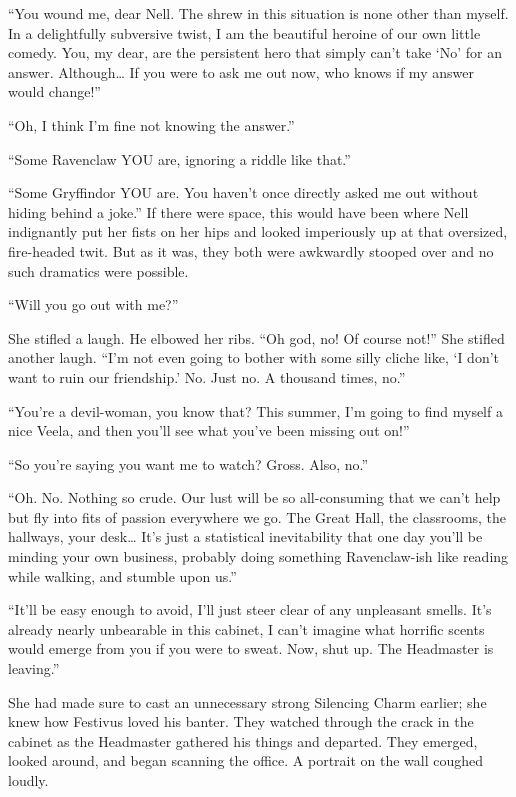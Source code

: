 “You wound me, dear Nell. The shrew in this situation is none other than myself. In a delightfully subversive twist, I am the beautiful heroine of our own little comedy. You, my dear, are the persistent hero that simply can’t take ‘No’ for an answer. Although… If you were to ask me out now, who knows if my answer would change!”

“Oh, I think I’m fine not knowing the answer.”

“Some Ravenclaw YOU are, ignoring a riddle like that.”

“Some Gryffindor YOU are. You haven’t once directly asked me out without hiding behind a joke.” If there were space, this would have been where Nell indignantly put her fists on her hips and looked imperiously up at that oversized, fire-headed twit. But as it was, they both were awkwardly stooped over and no such dramatics were possible.

“Will you go out with me?”

She stifled a laugh. He elbowed her ribs. “Oh god, no! Of course not!” She stifled another laugh. “I’m not even going to bother with some silly cliche like, ‘I don’t want to ruin our friendship.’ No. Just no. A thousand times, no.”

“You’re a devil-woman, you know that? This summer, I’m going to find myself a nice Veela, and then you’ll see what you’ve been missing out on!”

“So you’re saying you want me to watch? Gross. Also, no.”

“Oh. No. Nothing so crude. Our lust will be so all-consuming that we can’t help but fly into fits of passion everywhere we go. The Great Hall, the classrooms, the hallways, your desk… It’s just a statistical inevitability that one day you’ll be minding your own business, probably doing something Ravenclaw-ish like reading while walking, and stumble upon us.”

“It’ll be easy enough to avoid, I’ll just steer clear of any unpleasant smells. It’s already nearly unbearable in this cabinet, I can’t imagine what horrific scents would emerge from you if you were to sweat. Now, shut up. The Headmaster is leaving.”

She had made sure to cast an unnecessary strong Silencing Charm earlier; she knew how Festivus loved his banter. They watched through the crack in the cabinet as the Headmaster gathered his things and departed. They emerged, looked around, and began scanning the office. A portrait on the wall coughed loudly.

